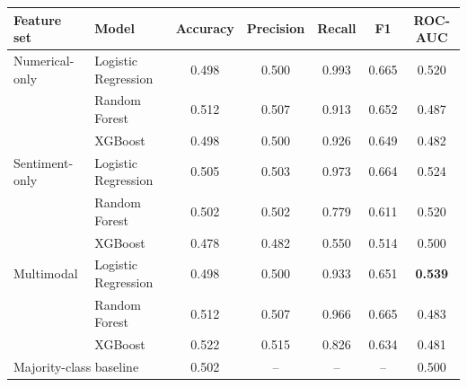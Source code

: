 \begin{tabular}{@{}llccccc@{}}
\toprule
Feature set & Model & Accuracy & Precision & Recall & F1 & ROC-AUC \\
\midrule
Numerical-only & Logistic Regression & 0.498 & 0.500 & 0.993 & 0.665 & 0.520 \\
 & Random Forest & 0.512 & 0.507 & 0.913 & 0.652 & 0.487 \\
 & XGBoost & 0.498 & 0.500 & 0.926 & 0.649 & 0.482 \\
\midrule
Sentiment-only & Logistic Regression & 0.505 & 0.503 & 0.973 & 0.664 & 0.524 \\
 & Random Forest & 0.502 & 0.502 & 0.779 & 0.611 & 0.520 \\
 & XGBoost & 0.478 & 0.482 & 0.550 & 0.514 & 0.500 \\
\midrule
Multimodal & Logistic Regression & 0.498 & 0.500 & 0.933 & 0.651 & \textbf{0.539} \\
 & Random Forest & 0.512 & 0.507 & 0.966 & 0.665 & 0.483 \\
 & XGBoost & 0.522 & 0.515 & 0.826 & 0.634 & 0.481 \\
\midrule
\multicolumn{2}{l}{Majority-class baseline} & 0.502 & -- & -- & -- & 0.500 \\
\bottomrule
\end{tabular}
